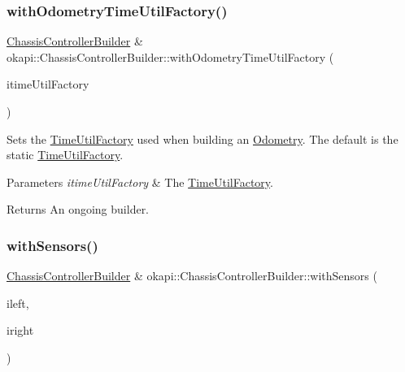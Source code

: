 \subsubsection{\texorpdfstring{withOdometryTimeUtilFactory()}{withOdometryTimeUtilFactory()}}
{\footnotesize\ttfamily \mbox{\hyperlink{classokapi_1_1ChassisControllerBuilder}{Chassis\+Controller\+Builder}} \& okapi\+::\+Chassis\+Controller\+Builder\+::with\+Odometry\+Time\+Util\+Factory (\begin{DoxyParamCaption}\item[{const \mbox{\hyperlink{classokapi_1_1TimeUtilFactory}{Time\+Util\+Factory}} \&}]{itime\+Util\+Factory }\end{DoxyParamCaption})}

Sets the \mbox{\hyperlink{classokapi_1_1TimeUtilFactory}{Time\+Util\+Factory}} used when building an \mbox{\hyperlink{classokapi_1_1Odometry}{Odometry}}. The default is the static \mbox{\hyperlink{classokapi_1_1TimeUtilFactory}{Time\+Util\+Factory}}.


\begin{DoxyParams}{Parameters}
{\em itime\+Util\+Factory} & The \mbox{\hyperlink{classokapi_1_1TimeUtilFactory}{Time\+Util\+Factory}}. \\
\hline
\end{DoxyParams}
\begin{DoxyReturn}{Returns}
An ongoing builder. 
\end{DoxyReturn}
\mbox{\label{classokapi_1_1ChassisControllerBuilder_a0197aa35c2c36dd82476bc70c5824a56}} 
\subsubsection{\texorpdfstring{withSensors()}{withSensors()}\hspace{0.1cm}{\footnotesize\ttfamily [1/6]}}
{\footnotesize\ttfamily \mbox{\hyperlink{classokapi_1_1ChassisControllerBuilder}{Chassis\+Controller\+Builder}} \& okapi\+::\+Chassis\+Controller\+Builder\+::with\+Sensors (\begin{DoxyParamCaption}\item[{const \mbox{\hyperlink{classokapi_1_1ADIEncoder}{A\+D\+I\+Encoder}} \&}]{ileft,  }\item[{const \mbox{\hyperlink{classokapi_1_1ADIEncoder}{A\+D\+I\+Encoder}} \&}]{iright }\end{DoxyParamCaption})}

